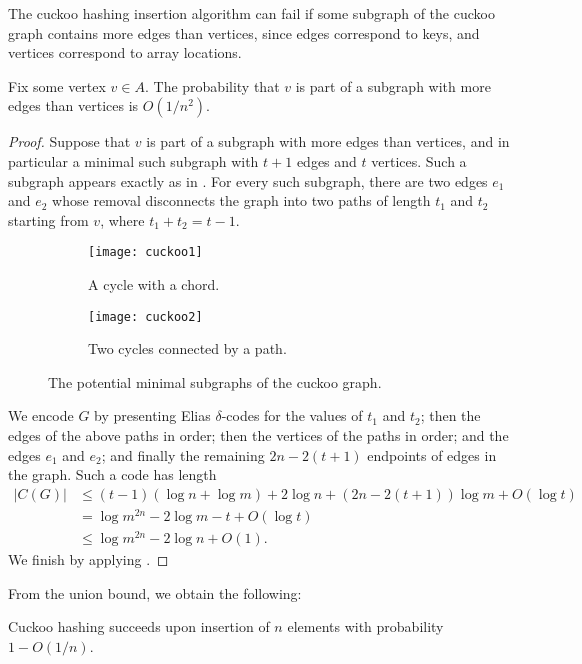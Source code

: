The cuckoo hashing insertion algorithm can fail if some subgraph of
the cuckoo graph contains more edges than vertices, since edges
correspond to keys, and vertices correspond to array locations.
\begin{lem}
  Fix some vertex $v \in A$. The probability that $v$ is part of a
  subgraph with more edges than vertices is $O(1/n^2)$.
\end{lem}
\begin{proof}
  Suppose that $v$ is part of a subgraph with more edges than
  vertices, and in particular a minimal such subgraph with $t + 1$
  edges and $t$ vertices. Such a subgraph appears exactly as in
  . For every such subgraph, there are two edges
  $e_1$ and $e_2$ whose removal disconnects the graph into two paths
  of length $t_1$ and $t_2$ starting from $v$, where
  $t_1 + t_2 = t - 1$.

  \begin{figure}
    \centering
    \begin{subfigure}[b]{0.3\textwidth}
      \texttt{[image: cuckoo1]}
      \caption{A cycle with a chord.}
    \end{subfigure}
    \quad\quad
    \begin{subfigure}[b]{0.6\textwidth}
      \texttt{[image: cuckoo2]}
      \caption{Two cycles connected by a path.}
    \end{subfigure}
    \caption{The potential minimal subgraphs of the cuckoo graph.}
  \end{figure}

  We encode $G$ by presenting Elias $\delta$-codes for the values of
  $t_1$ and $t_2$; then the edges of the above paths in order; then
  the vertices of the paths in order; and the edges $e_1$ and $e_2$;
  and finally the remaining $2n - 2(t + 1)$ endpoints of edges in the
  graph. Such a code has length
  \begin{align*}
    |C(G)| &\leq (t - 1)(\log n + \log m) + 2\log n + (2n - 2(t + 1))\log m + O(\log t) \\
           &= \log m^{2n} - 2\log m - t + O(\log t) \\
           &\leq \log m^{2n} - 2\log n + O(1).
  \end{align*}
  We finish by applying .
\end{proof}

From the union bound, we obtain the following:
\begin{cor}
  Cuckoo hashing succeeds upon insertion of $n$ elements with
  probability $1 - O(1/n)$.
\end{cor}


